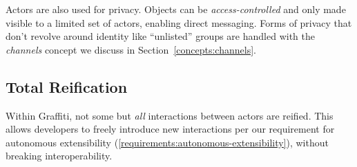 Actors are also used for privacy.
Objects can be \emph{access-controlled} and only
made visible to a limited set of actors, enabling
direct messaging.
Forms of privacy that don't revolve around identity
like ``unlisted'' groups are handled
with the \emph{channels} concept we discuss in
Section~\ref{concepts:channels}.



\subsection{Total Reification}
\label{concepts:total-reification}

Within Graffiti, not some but \emph{all} interactions between actors
are reified.
This allows developers to freely introduce new interactions
per our requirement for autonomous extensibility (\ref{requirements:autonomous-extensibility}),
without breaking interoperability.




